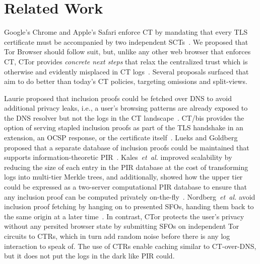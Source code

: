 \section{Related Work} \label{sec:related}
Google's Chrome and Apple's Safari enforce CT by mandating that every TLS
certificate must be accompanied by two independent
SCTs~\cite{chrome-policy,safari-policy}.  We proposed that Tor Browser should
follow suit, but, unlike any other web browser that enforces CT, CTor provides
\emph{concrete next steps} that relax the centralized trust which is otherwise
and evidently misplaced in CT logs~\cite{%
	izenpe-disqualified,%
	venafi-disqualified,%
	gdca1-omission,%
	digicert-log-compromised%
}.  Several proposals surfaced that aim to do better than today's CT
policies, targeting omissions and split-views.

Laurie proposed that inclusion proofs could be fetched over DNS to avoid
additional privacy leaks, i.e., a user's browsing patterns are already exposed
to the DNS resolver but not the logs in the CT landscape~\cite{ct-over-dns}.
CT/bis provides the option of serving stapled inclusion proofs as part of the
TLS handshake in an extension, an OCSP response, or the certificate
itself~\cite{ct/bis}.
Lueks and Goldberg proposed that a separate database of inclusion proofs could
be maintained that supports information-theoretic PIR~\cite{lueks-and-goldberg}.
Kales~\emph{et~al.} improved scalability by reducing the size of each entry
in the PIR database at the cost of transforming logs into multi-tier Merkle
trees, and additionally, showed how the upper tier could be expressed as
a two-server computational PIR database to ensure that any inclusion proof can
be computed privately on-the-fly~\cite{kales}.
Nordberg~\emph{et~al.} avoid inclusion proof fetching by hanging on to presented
SFOs, handing them back to the same origin at a later time~\cite{nordberg}.
In contrast, CTor protects the user's privacy without any persited browser state
by submitting SFOs on independent Tor circuits to CTRs, which in turn add random
noise before there is any log interaction to speak of.  The use of CTRs
enable caching similar to CT-over-DNS, but it does not put the logs in the dark
like PIR could.

